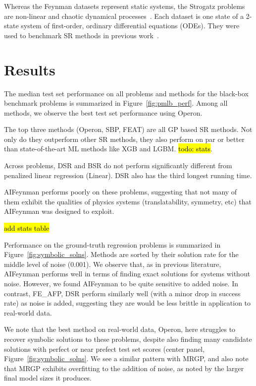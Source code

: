 Whereas the Feynman datasets represent static systems, the Strogatz problems are non-linear and chaotic dynamical processes~\cite{strogatzNonlinearDynamicsChaos2014}.
Each dataset is one state of a 2-state system of first-order, ordinary differential equations (ODEs). 
They were used to benchmark SR methods in previous work~\cite{lacavaInferenceCompactNonlinear2016,schmidtMachineScienceAutomated2011}.

\section{Results}
The median test set performance on all problems and methods for the black-box benchmark problems is summarized in Figure~\ref{fig:pmlb_perf}. 
Among all methods, we observe the best test set performance using Operon. 

The top three methods (Operon, SBP, FEAT) are all GP based SR methods. 
Not only do they outperform other SR methods, they also perform on par or better than state-of-the-art ML methods like XGB and LGBM. 
\hl{todo: stats}. 

Across problems, DSR and BSR do not perform significantly different from penalized linear regression (Linear). 
DSR also has the third longest running time. 

AIFeynman performs poorly on these problems, suggesting that not many of them exhibit the qualities of physics systems (translatability, symmetry, etc) that AIFeynman was designed to exploit. 

\hl{add stats table}

Performance on the ground-truth regression problems is summarized in Figure~\ref{fig:symbolic_solns}. 
Methods are sorted by their solution rate for the middle level of noise (0.001). 
We observe that, as in previous literature, AIFeynman performs well in terms of finding exact solutions for systems without noise. 
However, we found AIFeynman to be quite sensitive to added noise. 
In contrast, FE\_AFP, DSR perform similarly well (with a minor drop in success rate) as noise is added, suggesting they are would be less brittle in application to real-world data. 

We note that the best method on real-world data, Operon, here struggles to recover symbolic solutions to these problems, despite also finding many candidate solutions with perfect or near prefect test set scores (center panel, Figure~\ref{fig:symbolic_solns}. 
We see a similar pattern with MRGP, and also note that MRGP exhibits overfitting to the addition of noise, as noted by the larger final model sizes it produces. 

